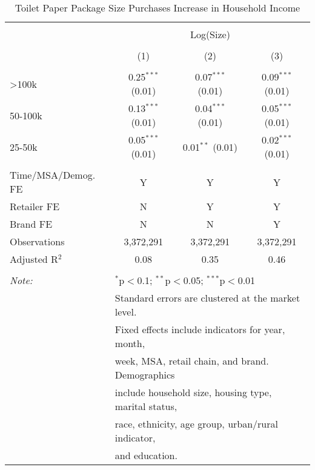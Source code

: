 
\begin{table}[!htbp] \centering 
  \caption{Toilet Paper Package Size Purchases Increase in Household Income} 
  \label{tab:packageSizeFullTP} 
\begin{tabular}{@{\extracolsep{5pt}}lccc} 
\\[-1.8ex]\hline 
\hline \\[-1.8ex] 
 & \multicolumn{3}{c}{Log(Size)} \\ 
\\[-1.8ex] & (1) & (2) & (3)\\ 
\hline \\[-1.8ex] 
 >100k & 0.25$^{***}$ (0.01) & 0.07$^{***}$ (0.01) & 0.09$^{***}$ (0.01) \\ 
  50-100k & 0.13$^{***}$ (0.01) & 0.04$^{***}$ (0.01) & 0.05$^{***}$ (0.01) \\ 
  25-50k & 0.05$^{***}$ (0.01) & 0.01$^{**}$ (0.01) & 0.02$^{***}$ (0.01) \\ 
 \hline \\[-1.8ex] 
Time/MSA/Demog. FE & Y & Y & Y \\ 
Retailer FE & N & Y & Y \\ 
Brand FE & N & N & Y \\ 
Observations & 3,372,291 & 3,372,291 & 3,372,291 \\ 
Adjusted R$^{2}$ & 0.08 & 0.35 & 0.46 \\ 
\hline 
\hline \\[-1.8ex] 
\textit{Note:}  & \multicolumn{3}{l}{$^{*}$p$<$0.1; $^{**}$p$<$0.05; $^{***}$p$<$0.01} \\ 
 & \multicolumn{3}{l}{Standard errors are clustered at the market level.} \\ 
 & \multicolumn{3}{l}{Fixed effects include indicators for year, month, } \\ 
 & \multicolumn{3}{l}{week, MSA, retail chain, and brand. Demographics } \\ 
 & \multicolumn{3}{l}{include household size, housing type, marital status, } \\ 
 & \multicolumn{3}{l}{race, ethnicity, age group, urban/rural indicator, } \\ 
 & \multicolumn{3}{l}{and education.} \\ 
\end{tabular} 
\end{table} 
